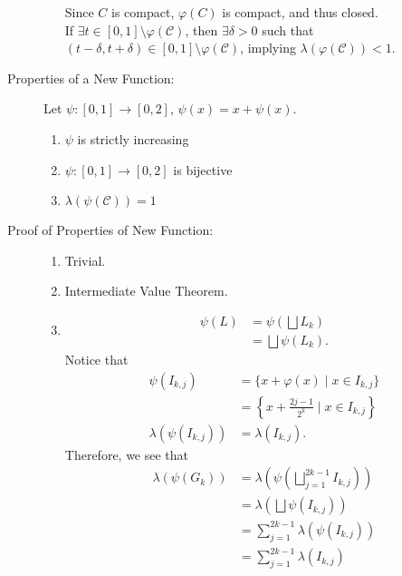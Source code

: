 \documentclass[10pt]{extarticle}
\begin{document}
\begin{description}
\begin{enumerate}[(1)]
          Since $C$ is compact, $\varphi(C)$ is compact, and thus closed.\\

          If $\exists t\in [0,1]\setminus \varphi(\mathcal{C})$, then $\exists \delta > 0$ such that $(t-\delta,t+\delta)\in [0,1]\setminus \varphi(\mathcal{C})$, implying $\lambda(\varphi(\mathcal{C})) < 1$.
      \end{enumerate}
    \item[Properties of a New Function:] Let $\psi: [0,1]\rightarrow [0,2]$, $\psi(x) = x + \psi(x)$.
      \begin{enumerate}[(1)]
        \item $\psi$ is strictly increasing
        \item $\psi: [0,1]\rightarrow [0,2]$ is bijective
        \item $\lambda(\psi(\mathcal{C})) = 1$
      \end{enumerate}
    \item[Proof of Properties of New Function:]\hfill
      \begin{enumerate}[(1)]
        \item Trivial.
        \item Intermediate Value Theorem.
        \item 
          \begin{align*}
            \psi(L) &= \psi\left(\bigsqcup L_k\right)\\
                    &= \bigsqcup \psi(L_k).
          \end{align*}
          Notice that
          \begin{align*}
            \psi(I_{k,j}) &= \{x + \varphi(x)\mid x\in I_{k,j}\}\\
                          &= \left\{x + \frac{2j-1}{2^{k}}\mid x\in I_{k,j}\right\}\\
            \lambda(\psi(I_{k,j})) &= \lambda(I_{k,j}).
          \end{align*}
          Therefore, we see that
          \begin{align*}
            \lambda(\psi(G_k)) &= \lambda\left(\psi\left(\bigsqcup_{j=1}^{2k-1}I_{k,j}\right)\right)\\
                               &= \lambda\left(\bigsqcup\psi(I_{k,j})\right)\\
                               &= \sum_{j=1}^{2k-1} \lambda(\psi(I_{k,j}))\\
                               &= \sum_{j=1}^{2k-1}\lambda(I_{k,j})\\

\end{align*}
\end{enumerate}
\end{description}
\end{document}
